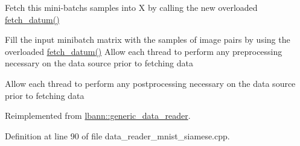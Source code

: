 Fetch this mini-\/batch\textquotesingle{}s samples into X by calling the new overloaded \hyperlink{classlbann_1_1data__reader__mnist__siamese_a299dd32be165c5acf320b6f40404cb17}{fetch\+\_\+datum()} 

Fill the input minibatch matrix with the samples of image pairs by using the overloaded \hyperlink{classlbann_1_1data__reader__mnist__siamese_a299dd32be165c5acf320b6f40404cb17}{fetch\+\_\+datum()} Allow each thread to perform any preprocessing necessary on the data source prior to fetching data

Allow each thread to perform any postprocessing necessary on the data source prior to fetching data 

Reimplemented from \hyperlink{classlbann_1_1generic__data__reader_a46b658ba4f6b746632b683568ab76f77}{lbann\+::generic\+\_\+data\+\_\+reader}.



Definition at line 90 of file data\+\_\+reader\+\_\+mnist\+\_\+siamese.\+cpp.


